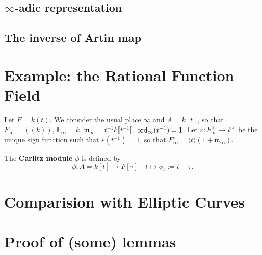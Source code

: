 \documentclass{article}
\newcommand{\F}{\mathbb{F}}
\newcommand{\m}{\mathfrak{m}}
\newcommand{\llpar}{(\!(}
\newcommand{\rrpar}{)\!)}
\begin{document}
\subsection{\texorpdfstring{$\infty$}{infty}-adic representation}

\subsection{The inverse of Artin map}



\section{Example: the Rational Function Field}
Let $F = k(t)$.
We consider the usual place $\infty$ and $A = k[t]$,
so that $F_\infty = \llpar k\rrpar$,
$\F_\infty = k$,
$\m_\infty = t^{-1}k\llbracket t^{-1}\rrbracket$,
$\operatorname{ord}_{\infty}(t^{-1}) = 1$.
Let $\varepsilon : F_\infty^\times\to k^\times$ be the unique sign function such that $\varepsilon(t^{-1}) = 1$,
so that $F_\infty^+ = \langle t\rangle ( 1 + \m_\infty)$.

The \textbf{Carlitz module} $\phi$ is defined by \[\phi : A = k[t]\to F[\tau]\quad t\mapsto \phi_t := t + \tau.\]


\section{Comparision with Elliptic Curves}


\section{Proof of (some) lemmas}
\end{document}
